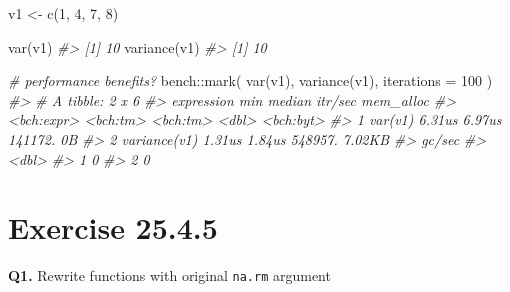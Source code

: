 \documentclass[
]{book}
\newenvironment{Shaded}{\begin{snugshade}}{\end{snugshade}}
\newcommand{\AttributeTok}[1]{\textcolor[rgb]{0.77,0.63,0.00}{#1}}
\newcommand{\CommentTok}[1]{\textcolor[rgb]{0.56,0.35,0.01}{\textit{#1}}}
\newcommand{\DecValTok}[1]{\textcolor[rgb]{0.00,0.00,0.81}{#1}}
\newcommand{\FunctionTok}[1]{\textcolor[rgb]{0.00,0.00,0.00}{#1}}
\newcommand{\NormalTok}[1]{#1}
\newcommand{\OtherTok}[1]{\textcolor[rgb]{0.56,0.35,0.01}{#1}}
\newcommand{\SpecialCharTok}[1]{\textcolor[rgb]{0.00,0.00,0.00}{#1}}
\begin{document}
\begin{Shaded}
\begin{Highlighting}[]
\NormalTok{v1 }\OtherTok{\textless{}{-}} \FunctionTok{c}\NormalTok{(}\DecValTok{1}\NormalTok{, }\DecValTok{4}\NormalTok{, }\DecValTok{7}\NormalTok{, }\DecValTok{8}\NormalTok{)}

\FunctionTok{var}\NormalTok{(v1)}
\CommentTok{\#\textgreater{} [1] 10}
\FunctionTok{variance}\NormalTok{(v1)}
\CommentTok{\#\textgreater{} [1] 10}

\CommentTok{\# performance benefits?}
\NormalTok{bench}\SpecialCharTok{::}\FunctionTok{mark}\NormalTok{(}
  \FunctionTok{var}\NormalTok{(v1),}
  \FunctionTok{variance}\NormalTok{(v1),}
  \AttributeTok{iterations =} \DecValTok{100}
\NormalTok{)}
\CommentTok{\#\textgreater{} \# A tibble: 2 x 6}
\CommentTok{\#\textgreater{}   expression        min   median \textasciigrave{}itr/sec\textasciigrave{} mem\_alloc}
\CommentTok{\#\textgreater{}   \textless{}bch:expr\textgreater{}   \textless{}bch:tm\textgreater{} \textless{}bch:tm\textgreater{}     \textless{}dbl\textgreater{} \textless{}bch:byt\textgreater{}}
\CommentTok{\#\textgreater{} 1 var(v1)        6.31us   6.97us   141172.        0B}
\CommentTok{\#\textgreater{} 2 variance(v1)   1.31us   1.84us   548957.    7.02KB}
\CommentTok{\#\textgreater{}   \textasciigrave{}gc/sec\textasciigrave{}}
\CommentTok{\#\textgreater{}      \textless{}dbl\textgreater{}}
\CommentTok{\#\textgreater{} 1        0}
\CommentTok{\#\textgreater{} 2        0}
\end{Highlighting}
\end{Shaded}

\hypertarget{exercise-25.4.5}{%
\section{Exercise 25.4.5}\label{exercise-25.4.5}}

\textbf{Q1.} Rewrite functions with original \texttt{na.rm} argument
\end{document}
